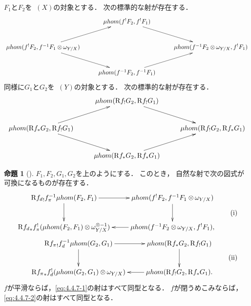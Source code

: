 \documentclass[leqno, 10pt, a4paper, dvipdfmx]{jsarticle}
\theoremstyle{definition}
\numberwithin{equation}{section}
\newcommand{\Dompb}{\mathop{\mathsf{D}^\mathrm{b}}\nolimits}
\newcommand{\Rder}{\mathrm{R}}
\newcommand{\tens}[1][]{\mathbin{\otimes_{\raise1.5ex\hbox to-.1em{}{#1}}}}
\theoremstyle{mystyle}
\newtheorem{PRP}[AXM]{命題}
\renewenvironment{leftbar}{%
  \def\FrameCommand{\textcolor{lightgray}{\vrule width 4pt} \hspace{10pt}}%
  \MakeFramed {\advance\hsize-\width \FrameRestore}}%
{\endMakeFramed}
\newcommand{\mpb}[1][]{{#1}_{\pi}} %
\newcommand{\mdiff}[1][]{{#1}_{d}} %
\newcommand{\muhom}{\mu hom}
\begin{document}
\(F_1\)と\(F_2\)を\(\Dompb(X)\)の対象とする．
次の標準的な射が存在する．
\begin{equation}
    \vcenter{\xymatrix{
        &\muhom(f^{!}F_2,f^{!}F_1)\ar[rd]&\\
        \muhom(f^{!}F_2,f^{-1}F_1\tens[]\omega_{Y/X})\ar[ru]\ar[rd]
        &
        &
        \muhom(f^{-1}F_2\tens[]\omega_{Y/X},f^{!}F_1)
        \\
        &\muhom(f^{-1}F_2,f^{-1}F_1)\ar[ru]&
    }}
\end{equation}
同様に\(G_1\)と\(G_2\)を\(\Dompb(Y)\)の対象とする．
次の標準的な射が存在する．
\begin{equation}
    \vcenter{\xymatrix{
        &\muhom(\Rder{f_{!}}G_2,\Rder{f_{!}}G_1)\ar[rd]&\\
        \muhom(\Rder{f_{\ast}}G_2,\Rder{f_{!}}G_1)\ar[ru]\ar[rd]
        &
        &
        \muhom(\Rder{f_{!}}G_2,\Rder{f_{\ast}}G_1)
        \\
        &\muhom(\Rder{f_{\ast}}G_2,\Rder{f_{\ast}}G_1)\ar[ru]&
    }}
\end{equation}

\begin{leftbar}
\begin{PRP}[{\cite[Prop.4.4.7]{KS90}}]\label{prp.4.4.7}
  \(F_1,F_2,G_1,G_2\)を上のようにする．
  このとき，
  自然な射で次の図式が可換になるものが存在する．
  \begin{align}
    \vcenter{\xymatrix{
      \Rder{{\mdiff[f]}_{!}}\mpb[f]^{-1}\muhom(F_2,F_1)
      \ar[r]
      \ar[d]
      &
      \muhom(f^{!}F_2,f^{-1}F_1\tens[]\omega_{Y/X})
      \ar[d]
      \\
      \Rder{{\mdiff[f]}_{\ast}}\mpb[f]^{!}(\muhom(F_2,F_1)\tens[]\omega_{Y/X}^{{\otimes}-1})
      &
      \muhom(f^{-1}F_2\tens[]\omega_{Y/X},f^{!}F_1),
      \ar[l]
    }}\tag{i}\label{eq:4.4.7-1}\\
    \vcenter{\xymatrix{
      \Rder{{\mpb[f]}_{!}}\mdiff[f]^{-1}\muhom(G_2, G_1)
      \ar[r]
      \ar[d]
      &
      \muhom(\Rder{f_{\ast}}G_2,\Rder{f_{!}}G_1)
      \ar[d]
      \\
      \Rder{{\mpb[f]}_{\ast}}\mdiff[f]^{!}(\muhom(G_2, G_1)\tens[]\omega_{Y/X})
      &
      \muhom(\Rder{f_{!}}G_2,\Rder{f_{\ast}}G_1).
      \ar[l]
    }}\tag{ii}\label{eq:4.4.7-2}
  \end{align}
  \(f\)が平滑ならば，\eqref{eq:4.4.7-1}の射はすべて同型となる．
  \(f\)が閉うめこみならば，\eqref{eq:4.4.7-2}の射はすべて同型となる．
\end{PRP}
\end{leftbar}
\end{document}
